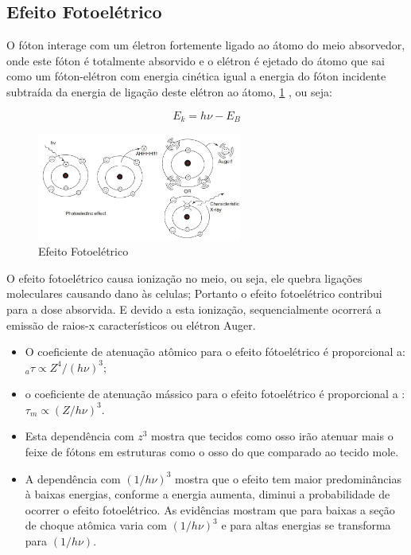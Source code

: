 \documentclass[11pt,a4paper]{article}
\begin{document}
        \subsection{Efeito Fotoelétrico}

            O fóton interage com um életron fortemente ligado ao átomo do meio absorvedor, onde este fóton é totalmente absorvido e o elétron é ejetado do átomo que sai como um fóton-elétron com energia cinética igual a energia do fóton incidente subtraída da energia de ligação deste elétron ao átomo, \ref{fig:efeitoFotoeletrico} , ou seja:



                \begin{equation}
                    E_k = h\nu - E_B
                \end{equation}

                \begin{figure}[h]
                    \centering
                    \includegraphics[width=0.6\textwidth]{Imagens/efeitoFotoeletrico.JPG}
                    \caption{Efeito Fotoelétrico}
                    \label{fig:efeitoFotoeletrico}
                \end{figure}

                O efeito fotoelétrico causa ionização no meio, ou seja, ele quebra ligações moleculares causando dano às celulas; Portanto o efeito fotoelétrico contribui para a dose absorvida. E devido a esta ionização, sequencialmente ocorrerá a emissão de raios-x característicos ou elétron Auger.

            \begin{itemize}
                \item O coeficiente de atenuação atômico para o efeito fótoelétrico é proporcional a: ${}_a\tau \propto Z^4 / (h\nu)^3$;
                \item o coeficiente de atenuação mássico para o efeito fotoelétrico é proporcional a
                : $\tau_m \propto (Z / h\nu)^3$. 
                \item Esta dependência com $z^3$ mostra que tecidos como osso irão atenuar mais o feixe de fótons em estruturas como o osso do que comparado ao tecido mole. 
                \item A dependência com $(1 / h\nu)^3$ mostra que o efeito tem maior predominâncias à baixas energias, conforme a energia aumenta, diminui a probabilidade de ocorrer o efeito fotoelétrico. As evidências mostram que para baixas a seção de choque atômica varia com $(1 / h\nu)^3$ e para altas energias se transforma para $(1 / h\nu)$. 
            \end{itemize}
\end{document}

